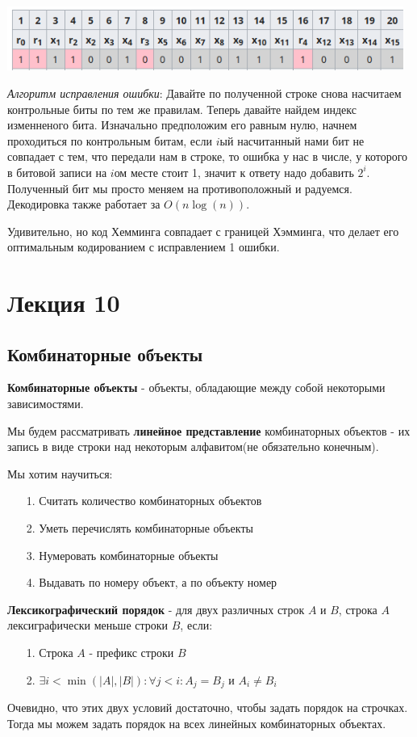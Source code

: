 \documentclass{article}
\begin{document}
\begin{center}
  \includegraphics[height=2.1cm]{Hemming_code.png}
\end{center}

\textit{Алгоритм исправления ошибки}: Давайте по полученной строке снова насчитаем контрольные биты по тем же правилам. Теперь давайте найдем индекс изменненого бита. Изначально предположим его равным нулю, начнем проходиться по контрольным битам, если $i$ый насчитанный нами бит не совпадает с тем, что передали нам в строке, то ошибка у нас в числе, у которого в битовой записи на $i$ом месте стоит 1, значит к ответу надо добавить $2^i$. Полученный бит мы просто меняем на противоположный и радуемся. Декодировка также работает за $O(n\log(n))$.

Удивительно, но код Хемминга совпадает с границей Хэмминга, что делает его оптимальным кодированием с исправлением 1 ошибки.

\section{Лекция 10}
\subsection{Комбинаторные объекты}
\textbf{Комбинаторные объекты} - объекты, обладающие между собой некоторыми зависимостями.

Мы будем рассматривать \textbf{линейное представление} комбинаторных объектов - их запись в виде строки над некоторым алфавитом(не обязательно конечным).

Мы хотим научиться:
\begin{enumerate}
\item[1.] Считать количество комбинаторных объектов
\item[2.] Уметь перечислять комбинаторные объекты
\item[3.] Нумеровать комбинаторные объекты 
\item[4.] Выдавать по номеру объект, а по объекту номер
\end{enumerate}
\textbf{Лексикографический порядок} - для двух различных строк $A$ и $B$, строка $A$ лексиграфически меньше строки $B$, если:
\begin{enumerate}
    \item[1.] Строка $A$ - префикс строки $B$
    \item[2.] $\exists i < \min(|A|, |B|): \forall j < i : A_j = B_j$ и $A_i \neq B_i$ 
\end{enumerate}
Очевидно, что этих двух условий достаточно, чтобы задать порядок на строчках. Тогда мы можем задать порядок на всех линейных комбинаторных объектах.
\end{document}
